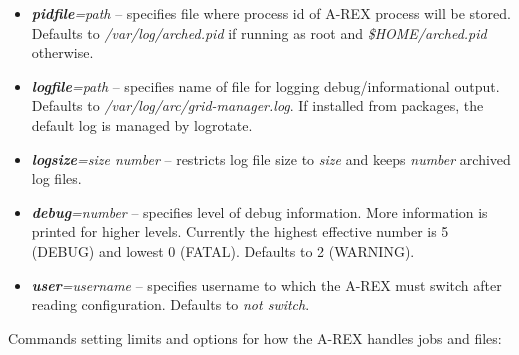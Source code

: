 \documentclass{article}                            %
\begin{document}
\begin{itemize}
\item \textbf{\textit{pidfile}}\textit{=path} -- specifies file where
  process id of A-REX process will be stored. Defaults to
  \emph{/var/log/arched.pid} if running as root and
  \emph{\$HOME/arched.pid} otherwise.
\item \textbf{\textit{logfile}}\textit{=path} -- specifies name of file
  for logging debug/informational output. Defaults to
  \emph{/var/log/arc/grid-manager.log}. If installed from packages, the
  default log is managed by logrotate.
\item \textbf{\textit{logsize}}\textit{=size number} -- restricts
  log file size to \emph{size} and keeps \emph{number} archived log
  files.
\item \textbf{\textit{debug}}\textit{=number} -- specifies level of
  debug information. More information is printed for higher
  levels. Currently the highest effective number is 5 (DEBUG) and
  lowest 0 (FATAL). Defaults to 2 (WARNING).
\item \textbf{\textit{user}}\textit{=username} -- specifies username to
  which the A-REX must switch after reading configuration. Defaults to
  \emph{not switch}.
\end{itemize}

Commands setting limits and options for how the A-REX handles jobs and
files:
\end{document}
